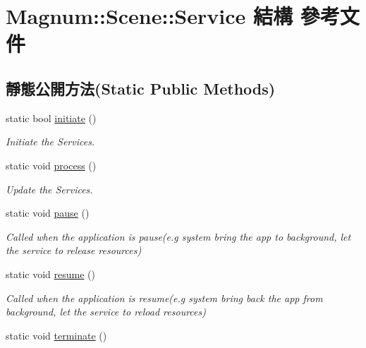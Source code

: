 \hypertarget{struct_magnum_1_1_scene_1_1_service}{}\section{Magnum\+:\+:Scene\+:\+:Service 結構 參考文件}
\label{struct_magnum_1_1_scene_1_1_service}
\subsection*{靜態公開方法(Static Public Methods)}
\begin{DoxyCompactItemize}
\item 
static bool \hyperlink{struct_magnum_1_1_scene_1_1_service_a8b16ddb2082fdcaa0aa03cd493709f77}{initiate} ()
\begin{DoxyCompactList}\small\item\em Initiate the Services. \end{DoxyCompactList}\item 
static void \hyperlink{struct_magnum_1_1_scene_1_1_service_af6ad0519436232cd604c72c3e21c5fa3}{process} ()\hypertarget{struct_magnum_1_1_scene_1_1_service_af6ad0519436232cd604c72c3e21c5fa3}{}\label{struct_magnum_1_1_scene_1_1_service_af6ad0519436232cd604c72c3e21c5fa3}

\begin{DoxyCompactList}\small\item\em Update the Services. \end{DoxyCompactList}\item 
static void \hyperlink{struct_magnum_1_1_scene_1_1_service_a214820124ce70577a78978891825a33f}{pause} ()\hypertarget{struct_magnum_1_1_scene_1_1_service_a214820124ce70577a78978891825a33f}{}\label{struct_magnum_1_1_scene_1_1_service_a214820124ce70577a78978891825a33f}

\begin{DoxyCompactList}\small\item\em Called when the application is pause(e.\+g system bring the app to background, let the service to release resources) \end{DoxyCompactList}\item 
static void \hyperlink{struct_magnum_1_1_scene_1_1_service_ab7c2d4600f691aac41b2948b7dfd8fdc}{resume} ()\hypertarget{struct_magnum_1_1_scene_1_1_service_ab7c2d4600f691aac41b2948b7dfd8fdc}{}\label{struct_magnum_1_1_scene_1_1_service_ab7c2d4600f691aac41b2948b7dfd8fdc}

\begin{DoxyCompactList}\small\item\em Called when the application is resume(e.\+g system bring back the app from background, let the service to reload resources) \end{DoxyCompactList}\item 
static void \hyperlink{struct_magnum_1_1_scene_1_1_service_a4619c184b272ca42ba8009409c0a7127}{terminate} ()\hypertarget{struct_magnum_1_1_scene_1_1_service_a4619c184b272ca42ba8009409c0a7127}{}\label{struct_magnum_1_1_scene_1_1_service_a4619c184b272ca42ba8009409c0a7127}


\end{DoxyCompactItemize}
